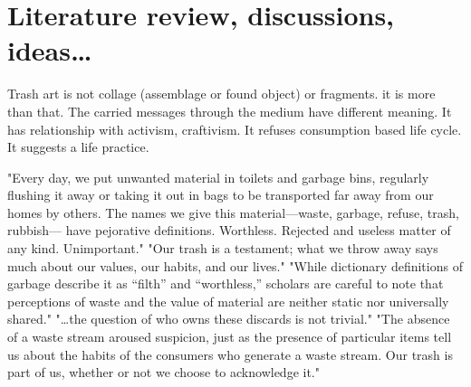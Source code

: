 \section{Literature review, discussions, ideas\ldots}
Trash art is not collage (assemblage or found object) or fragments. it is more than that. The carried messages through the medium have different meaning. It has relationship with activism, craftivism. It refuses consumption based life cycle. It suggests a life practice.

"Every day, we put unwanted material in toilets and garbage bins, regularly flushing it away or taking it out in bags to be transported far away from our homes by others. The names we give this material---waste, garbage, refuse, trash, rubbish--- have pejorative definitions. Worthless. Rejected and useless matter of any kind. Unimportant." "Our trash is a testament; what we throw away says much about our values, our habits, and our lives." "While dictionary definitions of garbage describe it as “filth” and “worthless,” scholars are careful to note that perceptions of waste and the value of material are neither static nor universally shared." "\ldots the question of who owns these discards is not trivial." "The absence of a waste stream aroused suspicion, just as the presence of particular items tell us about the habits of the consumers who generate a waste stream. Our trash is part of us, whether or not we choose to acknowledge it." \cite{zimring2012encyclopedia}

